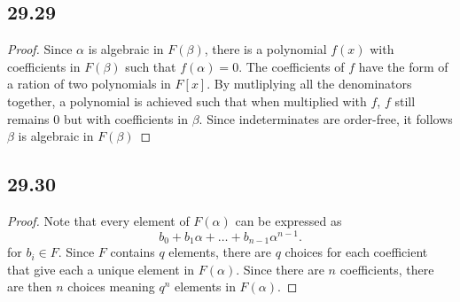 \documentclass[12pt,titlepage]{extarticle}
\begin{document}
\subsection*{29.29}
\begin{proof}
    Since $\alpha$ is algebraic in $F(\beta)$, there is a polynomial $f(x)$ with coefficients in $F(\beta)$ such that $f(\alpha) = 0$. The coefficients of $f$ have the form of a ration of two polynomials in $F[x]$. By mutliplying all the denominators together, a polynomial is achieved such that when multiplied with $f$, $f$ still remains $0$ but with coefficients in $\beta$. Since indeterminates are order-free, it follows $\beta$ is algebraic in $F(\beta)$
\end{proof}

\subsection*{29.30}
\begin{proof}
    Note that every element of $F(\alpha)$ can be expressed as
    \[
        b_0 + b_1 \alpha + \ldots + b_{n-1} \alpha^{n-1}
    .\]
    for $b_i \in F$. Since $F$ contains $q$ elements, there are $q$ choices for each coefficient that give each a unique element in $F(\alpha)$. Since there are $n$ coefficients, there are then $n$ choices meaning $q^n$ elements in $F(\alpha)$.
\end{proof}
\end{document}
